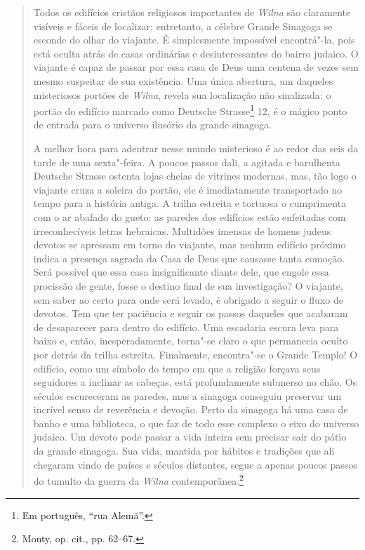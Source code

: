 \begin{quote}
Todos os edifícios cristãos religiosos importantes de \textit{Wilna} são
claramente visíveis e fáceis de localizar; entretanto, a célebre Grande
Sinagoga se esconde do olhar do viajante. É simplesmente impossível
encontrá"-la, pois está oculta atrás de casas ordinárias e
desinteressantes do bairro judaico. O viajante é capaz de passar por
essa casa de Deus uma centena de vezes sem mesmo suspeitar de sua
existência. Uma única abertura, um daqueles misteriosos portões de
\textit{Wilna}, revela sua localização não sinalizada: o portão do edifício
marcado como Deutsche Strasse\footnote{Em português, ``rua Alemã''.} 12, é o mágico ponto de
entrada para o universo ilusório da grande sinagoga.

A melhor hora para adentrar nesse mundo misterioso é ao redor das seis
da tarde de uma sexta"-feira. A poucos passos dali, a agitada e
barulhenta Deutsche Strasse ostenta lojas cheias de vitrines modernas,
mas, tão logo o viajante cruza a soleira do portão, ele é imediatamente
transportado no tempo para a história antiga. A trilha estreita e
tortuosa o cumprimenta com o ar abafado do gueto: as paredes dos
edifícios estão enfeitadas com irreconhecíveis letras hebraicas.
Multidões imensas de homens judeus devotos se apressam em torno do
viajante, mas nenhum edifício próximo indica a presença sagrada da Casa
de Deus que causasse tanta comoção. Será possível que essa casa
insignificante diante dele, que engole essa procissão de gente, fosse o
destino final de sua investigação? O viajante, sem saber ao certo para
onde será levado, é obrigado a seguir o fluxo de devotos. Tem que ter
paciência e seguir os passos daqueles que acabaram de desaparecer para
dentro do edifício. Uma escadaria escura leva para baixo e, então,
inesperadamente, torna"-se claro o que permanecia oculto por detrás da
trilha estreita. Finalmente, encontra"-se o Grande Templo! O edifício,
como um símbolo do tempo em que a religião forçava seus seguidores a
inclinar as cabeças, está profundamente submerso no chão. Os séculos
escureceram as paredes, mas a sinagoga conseguiu preservar um incrível
senso de reverência e devoção. Perto da sinagoga há uma casa de banho e
uma biblioteca, o que faz de todo esse complexo o eixo do universo
judaico. Um devoto pode passar a vida inteira sem precisar sair do pátio
da grande sinagoga. Sua vida, mantida por hábitos e tradições que ali
chegaram vindo de países e séculos distantes, segue a apenas poucos
passos do tumulto da guerra da \textit{Wilna} contemporânea.\footnote{Monty, op. cit., pp. 62--67.} 
\end{quote}

